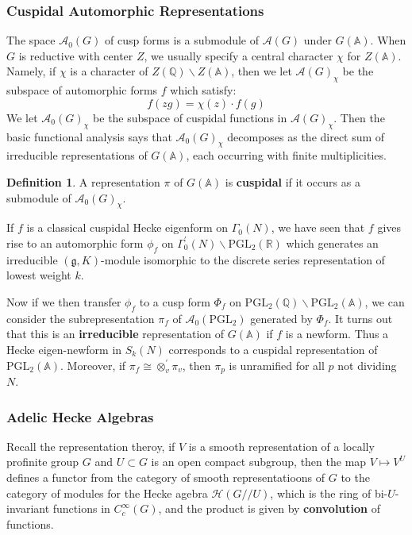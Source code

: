 \documentclass[11pt,english]{smfart}
\theoremstyle{definition}
\newtheorem{definition}{Definition}
\theoremstyle{remark}
\begin{document}
\subsubsection{Cuspidal Automorphic Representations}
The space $\mathcal{A}_0(G)$ of cusp forms is a submodule of $\mathcal{A}(G)$ under $G(\mathbb{A})$.
When $G$ is reductive with center $Z$, we usually specify a central character $\chi$ for $Z(\mathbb{A})$. Namely, if $\chi$ is a character of $Z(\mathbb{Q})\backslash Z(\mathbb{A})$, then we let $\mathcal{A}(G)_\chi$
be the subspace of automorphic forms $f$ which satisfy:
\[f(zg)=\chi(z) \cdot f(g)\]
We let $\mathcal{A}_0(G)_\chi$ be the subspace of cuspidal functions in $\mathcal{A}(G)_\chi$. Then the basic functional analysis says that $\mathcal{A}_0(G)_\chi$ decomposes as the direct sum of irreducible representations of $G(\mathbb{A})$,
each occurring with finite multiplicities.
\begin{definition}
A representation $\pi$ of $G(\mathbb{A})$ is \textbf{cuspidal} if it occurs as a submodule of $\mathcal{A}_0(G)_\chi$.
\end{definition}
If $ f $ is a classical cuspidal Hecke eigenform on $ \Gamma_{0}(N) $, we have seen that $ f $ gives rise to an automorphic form $ \phi_{f} $ on $ \Gamma_{0}^{\prime}(N) \backslash \mathrm{P G L}_{2}(\mathbb{R}) $ which generates an irreducible $ (\mathfrak{g}, K) $-module isomorphic to the discrete series representation of lowest weight $ k $.

Now if we then transfer $ \phi_{f} $ to a cusp form $ \Phi_{f} $ on $ \mathrm{P G L}_{2}(\mathbb{Q}) \backslash \mathrm{P G L}_{2}(\mathbb{A}) $,
we can consider the subrepresentation $ \pi_{f} $ of $ \mathcal{A}_{0}\left(\mathrm{P G L}_{2}\right) $ generated by $ \Phi_{f} $. It turns out that this is an \textbf{irreducible} representation of $ G(\mathbb{A}) $ if $ f $ is a newform.
Thus a Hecke eigen-newform in $ S_{k}(N) $ corresponds to a cuspidal representation of $ \mathrm{P G L}_{2}(\mathbb{A}) $. Moreover, if $ \pi_{f} \cong \otimes_{v}^{\prime} \pi_{v} $, then $ \pi_{p} $ is unramified for all $ p $ not dividing $ N $.
\subsubsection{Adelic Hecke Algebras}
Recall the representation theroy, if $ V $ is a smooth representation of a locally profinite group $ G $ and $ U \subset G $ is an open compact subgroup,
then the map $ V \mapsto V^{U} $ defines a functor from the category of smooth representatioons of $ G $ to the category of modules for the Hecke agebra $ \mathcal{H}(G / / U) $,
which is the ring of bi-$  U $-invariant functions in $ C_{c}^{\infty}(G) $, and the product is given by \textbf{convolution }of functions.
\end{document}
